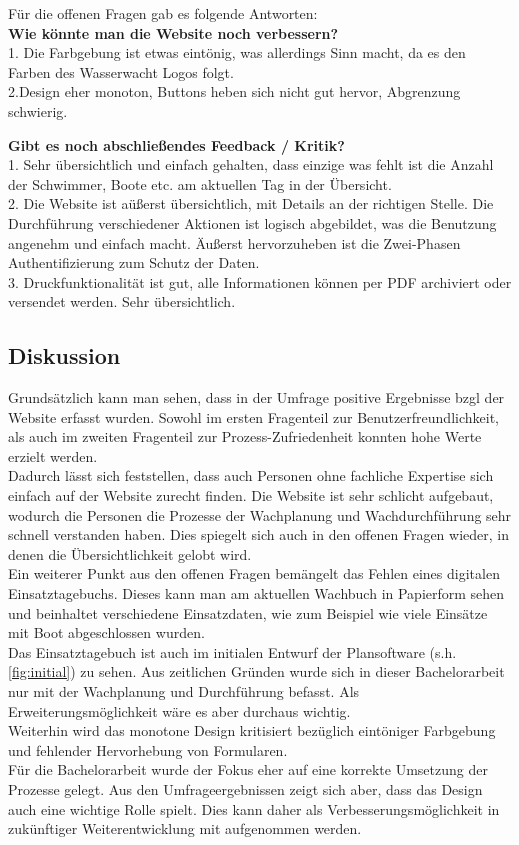 \documentclass[fontsize=12pt,openright,oneside,paper=a4,BCOR=1cm]{scrbook}
\begin{document}
Für die offenen Fragen gab es folgende Antworten: \\
\textbf{Wie könnte man die Website noch verbessern?} \\
1. Die Farbgebung ist etwas eintönig, was allerdings Sinn macht, da es den Farben des Wasserwacht Logos folgt. \\
2.Design eher monoton, Buttons heben sich nicht gut hervor, Abgrenzung schwierig. 

\textbf{Gibt es noch abschließendes Feedback / Kritik?} \\
1. Sehr übersichtlich und einfach gehalten, dass einzige was fehlt ist die Anzahl der Schwimmer, Boote etc. am aktuellen Tag in der Übersicht. \\
2. Die Website ist aüßerst übersichtlich, mit Details an der richtigen Stelle. Die Durchführung verschiedener Aktionen ist logisch abgebildet, was die Benutzung angenehm und einfach macht. Äußerst hervorzuheben ist die Zwei-Phasen Authentifizierung zum Schutz der Daten. \\
3. Druckfunktionalität ist gut, alle Informationen können per PDF archiviert oder versendet werden. Sehr übersichtlich. 

\subsection{Diskussion}
Grundsätzlich kann man sehen, dass in der Umfrage positive Ergebnisse bzgl der Website erfasst wurden. Sowohl im ersten Fragenteil zur Benutzerfreundlichkeit, als auch im zweiten Fragenteil zur Prozess-Zufriedenheit konnten hohe Werte erzielt werden. \\  
Dadurch lässt sich feststellen, dass auch Personen ohne fachliche Expertise sich einfach auf der Website zurecht finden. Die Website ist sehr schlicht aufgebaut, wodurch die Personen die Prozesse der Wachplanung und Wachdurchführung sehr schnell verstanden haben. Dies spiegelt sich auch in den offenen Fragen wieder, in denen die Übersichtlichkeit gelobt wird. \\ 
Ein weiterer Punkt aus den offenen Fragen bemängelt das Fehlen eines digitalen Einsatztagebuchs. Dieses kann man am aktuellen Wachbuch in Papierform sehen und beinhaltet verschiedene Einsatzdaten, wie zum Beispiel wie viele Einsätze mit Boot abgeschlossen wurden. \\
Das Einsatztagebuch ist auch im initialen Entwurf der Plansoftware (s.h. \ref{fig:initial}) zu sehen. Aus zeitlichen Gründen wurde sich in dieser Bachelorarbeit nur mit der Wachplanung und Durchführung befasst. Als Erweiterungsmöglichkeit wäre es aber durchaus wichtig. \\
Weiterhin wird das monotone Design kritisiert bezüglich eintöniger Farbgebung und fehlender Hervorhebung von Formularen. \\
Für die Bachelorarbeit wurde der Fokus eher auf eine korrekte Umsetzung der Prozesse gelegt.  Aus den Umfrageergebnissen zeigt sich aber, dass das Design auch eine wichtige Rolle spielt. Dies kann daher als Verbesserungsmöglichkeit in zukünftiger Weiterentwicklung mit aufgenommen werden.
\end{document}
